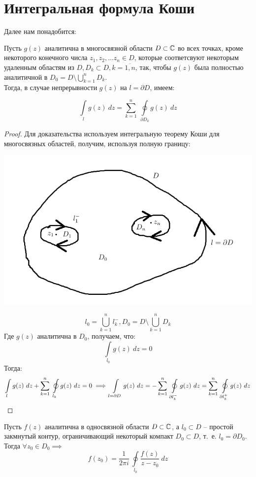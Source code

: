 \documentclass[../../main.tex]{subfiles}
\begin{document}
	\section{Интегральная формула Коши}
	Далее нам понадобится:
	\begin{lemma}
		Пусть $g(z)$ аналитична в многосвязной области $D \subset \mathbb{C}$ во всех точках, кроме некоторого конечного числа $z_1, z_2, \dots z_n \in D$, которые соответсвуют некоторым удаленным областям из $D, D_k \subset D, k = \overline{1,n}$, так, чтобы $g(z)$ была полностью аналитичной в $D_0 = D \setminus \bigcup \limits_{k=1}^{n} D_k$. \\
		Тогда, в случае непрерывности $g(z)$ на $l = \partial D$, имеем:
		
		\[\int \limits_{l} g(z) \ dz = \sum_{k=1}^{n} \ \oint \limits_{\partial D_k} g(z) \ dz  \]
	\end{lemma}	
	\begin{proof}
	Для доказательства используем интегральную теорему Коши для многосвязных областей, получим, используя полную границу:
	\begin{center}
		\includegraphics[width=0.7\linewidth]{lecture32_1}
	\end{center}
	\[ l_0 = \bigcup \limits_{k=1}^{n} l^{-}_{k}, D_0 = D \setminus \bigcup \limits_{k=1}^{n} D_k \]
	Где $g(z)$ аналитична в $D_0$, получаем, что:
	\[ \int \limits_{l_0} g(z) \ dz = 0 \]
	Тогда:
	\[ \int \limits_{l} g(z) \ dz + \sum^{n}_{k=1} \ \oint \limits_{ l_k} g(z) \ dz = 0 \implies \int \limits_{l = \partial D} g(z) \ dz = - \sum_{k=1}^{n} \ \oint \limits_{\partial l_k^{-} } g(z) \ dz = \sum_{k=1}^{n} \ \oint \limits_{\partial l_k^{+} } g(z) \ dz \qedhere \]
	\end{proof}	
\begin{theorem}
	Пусть $f(z)$ аналитична в односвязной области $D \subset \mathbb{C}$, а $l_0 \subset D$ \--- простой закмнутый контур, ограничивающий некоторый компакт $D_0 \subset D$, т.~е. $l_0 = \partial D_0$. Тогда $\forall z_0\in D_0 \implies$
	\begin{equation}
	\label{32:3}
	f(z_0) = \frac{1}{2\pi i} \ \oint \limits_{l_0} \frac{f(z)}{z-z_0} \ dz
	\end{equation}
\end{theorem}
\end{document}
